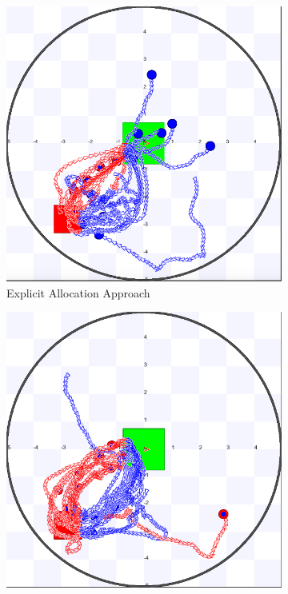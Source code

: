 \documentclass[letterpaper, 10 pt, conference]{ieeeconf}  %
\begin{document}







\begin{figure}[h]
  \begin{subfigure}{.23\textwidth}
      \includegraphics[width=0.7\linewidth]{images/explicit/1/raw/16.png}
         \centering
         \caption{Explicit Allocation Approach}
   \end{subfigure}%
     \begin{subfigure}{.23\textwidth}
       \includegraphics[width=0.7\linewidth]{images/embodied/1/raw/16.png}

\end{subfigure}
\end{figure}
\end{document}
